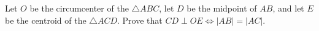 Let $O$ be the circumcenter of the $\triangle ABC$, let $D$ be the midpoint of $AB$, and let $E$ be the centroid of the $\triangle ACD$. Prove that $CD \perp OE \Leftrightarrow |AB| = |AC|$.
